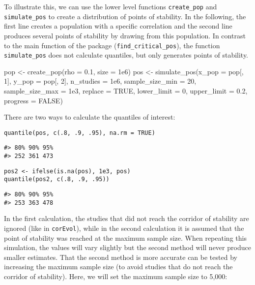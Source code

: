 To illustrate this, we can use the lower level functions \texttt{create\_pop} and \texttt{simulate\_pos} to create a distribution of points of stability. In the following, the first line creates a population with a specific correlation and the second line produces several points of stability by drawing from this population. In contrast to the main function of the package (\texttt{find\_critical\_pos}), the function \texttt{simulate\_pos} does not calculate quantiles, but only generates points of stability.

\begin{Schunk}
\begin{Sinput}
pop <- create_pop(rho = 0.1, size = 1e6)
pos <- simulate_pos(x_pop = pop[, 1], y_pop = pop[, 2], n_studies = 1e6,
                    sample_size_min = 20, sample_size_max = 1e3,
                    replace = TRUE, lower_limit = 0, upper_limit = 0.2,
                    progress = FALSE)
\end{Sinput}
\end{Schunk}

There are two ways to calculate the quantiles of interest:

\begin{verbatim}
quantile(pos, c(.8, .9, .95), na.rm = TRUE)
\end{verbatim}

\begin{verbatim}
#> 80% 90% 95% 
#> 252 361 473
\end{verbatim}

\begin{verbatim}
pos2 <- ifelse(is.na(pos), 1e3, pos)
quantile(pos2, c(.8, .9, .95))
\end{verbatim}

\begin{verbatim}
#> 80% 90% 95% 
#> 253 363 478
\end{verbatim}

In the first calculation, the studies that did not reach the corridor of stability are ignored (like in \texttt{corEvol}), while in the second calculation it is assumed that the point of stability was reached at the maximum sample size. When repeating this simulation, the values will vary slightly but the second method will never produce smaller estimates. That the second method is more accurate can be tested by increasing the maximum sample size (to avoid studies that do not reach the corridor of stability). Here, we will set the maximum sample size to 5,000:

